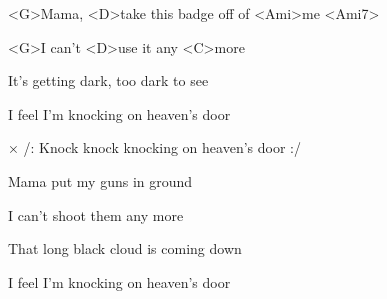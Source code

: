 

\zs
<G>Mama, <D>take this badge off of <Ami>me <Ami7>

<G>I can't <D>use it any <C>more

It's getting dark, too dark to see

I feel I'm knocking on heaven's door
\ks

× /: Knock knock knocking on heaven's door :/
\kr

\zs
Mama put my guns in ground

I can't shoot them any more

That long black cloud is coming down

I feel I'm knocking on heaven's door
\ks


\zr \kr
\kp






















